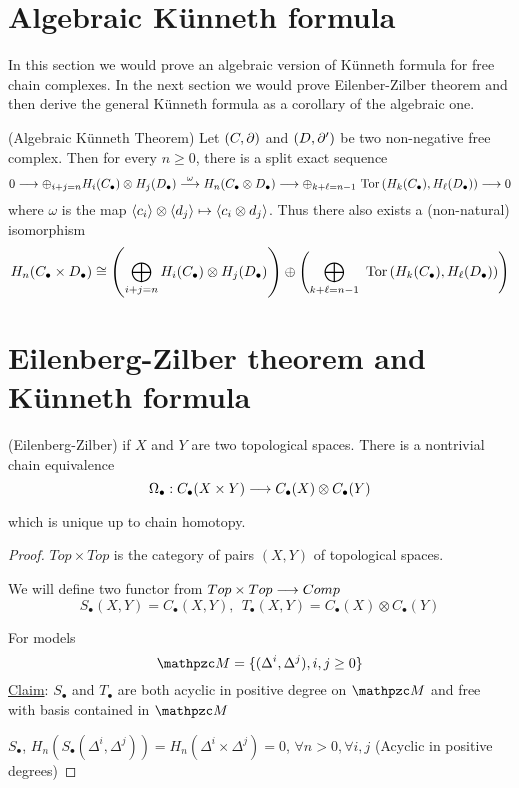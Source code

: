 \documentclass[11pt]{book} %
\begin{document}
\begin{proposition}
\section{Algebraic K\"unneth formula}
In this section
we would prove an algebraic version of K\"unneth formula for free chain complexes. In the next section we would prove Eilenber-Zilber theorem and then derive the general K\"unneth formula as a corollary of the algebraic one. 
\begin{theorem}\label{chap11thm:Algebraic_Kuenneth_formula}
(Algebraic K\"unneth Theorem) Let $(C,{\partial})$ and $(D,{\partial}')$ be two non-negative free complex. Then for every $n\geq 0$, there is a split exact sequence
$$
0\longrightarrow \oplus_{i+j=n}H_i(C_\bullet)\otimes H_j(D_\bullet)\overset{\omega}{\longrightarrow} H_n(C_\bullet\otimes D_\bullet)\longrightarrow \oplus_{k+\ell=n-1}\text{ Tor\,}(H_k(C_\bullet),H_\ell(D_\bullet))\longrightarrow 0
$$
where $\omega$ is the map $\langle c_i\rangle\otimes \langle d_j\rangle\mapsto \langle c_i\otimes d_j\rangle$. 
Thus there also exists a (non-natural) isomorphism 
$$
H_n(C_\bullet\times D_\bullet)\cong \left(\bigoplus_{i+j=n}H_i(C_\bullet)\otimes H_j (D_\bullet)\right)\oplus\left(\bigoplus_{k+\ell=n-1} \text{ Tor\,}(H_k(C_\bullet),H_\ell(D_\bullet))\right)
$$
\end{theorem}
\section{Eilenberg-Zilber theorem and K\"unneth formula}
\begin{theorem}
(Eilenberg-Zilber) if $X$ and $Y$ are two topological spaces. There is a nontrivial chain equivalence
$$
\Omega_\bullet: C_\bullet(X\times Y)\longrightarrow C_\bullet(X)\otimes C_\bullet (Y)
$$

which is unique up to chain homotopy.
\end{theorem}
\begin{proof}
$Top\times Top$ is the category of pairs $(X,Y)$ of topological spaces.

We will define two functor from $Top\times Top\longrightarrow Comp$
$$S_\bullet(X,Y)=C_\bullet(X,Y),\ \  T_\bullet (X,Y)=C_\bullet(X)\otimes C_\bullet(Y)$$

For models
$$
\pzm=\{(\Delta^i,\Delta^j), i,j \geq 0\}
$$ 
\underline{Claim}: $S_\bullet$ and $T_\bullet$ are both acyclic in positive degree on $\pzm$ and free with basis contained in $\pzm$

$S_\bullet$, $H_n(S_\bullet(\Delta^i, \Delta^j))=H_n(\Delta^i\times \Delta^j)=0$, $\forall n>0, \forall i,j$ (Acyclic in positive degrees)


\end{proof}
\end{proposition}
\end{document}

